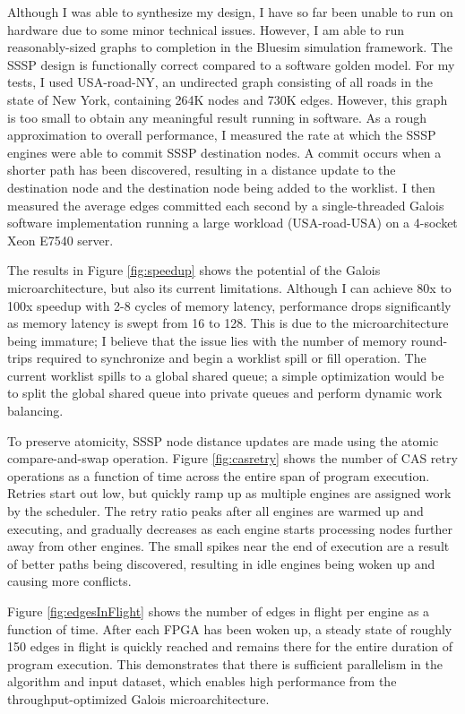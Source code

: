 Although I was able to synthesize my design, I have so far been unable to run on hardware due to some minor technical 
issues. However, I am able to run reasonably-sized graphs to completion in the Bluesim simulation framework. The SSSP 
design is functionally correct compared to a software golden model. For my tests, I used USA-road-NY, an undirected 
graph consisting of all roads in the state of New York, containing 264K nodes and 730K edges. However, this graph is 
too small to obtain any meaningful result running in software. As a rough approximation to overall performance, I 
measured the rate at which the SSSP engines were able to commit SSSP destination nodes. A commit occurs when a shorter 
path has been discovered, resulting in a distance update to the destination node and the destination node being added 
to the worklist. I then measured the average edges committed each second by a single-threaded Galois software 
implementation running a large workload (USA-road-USA) on a 4-socket Xeon E7540 server.

The results in Figure \ref{fig:speedup} shows the potential of the Galois microarchitecture, but also its current 
limitations. Although I can achieve 80x to 100x speedup with 2-8 cycles of memory latency, performance drops 
significantly as memory latency is swept from 16 to 128. This is due to the microarchitecture being immature; I believe 
that the issue lies with the number of memory round-trips required to synchronize and begin a worklist spill or fill 
operation. The current worklist spills to a global shared queue; a simple optimization would be to split the global 
shared queue into private queues and perform dynamic work balancing.

To preserve atomicity, SSSP node distance updates are made using the atomic compare-and-swap operation. Figure 
\ref{fig:casretry} shows the number of CAS retry operations as a function of time across the entire span of program 
execution. Retries start out low, but quickly ramp up as multiple engines are assigned work by the scheduler. The 
retry ratio peaks after all engines are warmed up and executing, and gradually decreases as each engine starts 
processing nodes further away from other engines. The small spikes near the end of execution are a result of better 
paths being discovered, resulting in idle engines being woken up and causing more conflicts.

Figure \ref{fig:edgesInFlight} shows the number of edges in flight per engine as a function of time. After each FPGA 
has been woken up, a steady state of roughly 150 edges in flight is quickly reached and remains there for the entire 
duration of program execution. This demonstrates that there is sufficient parallelism in the algorithm and input 
dataset, which enables high performance from the throughput-optimized Galois microarchitecture.

